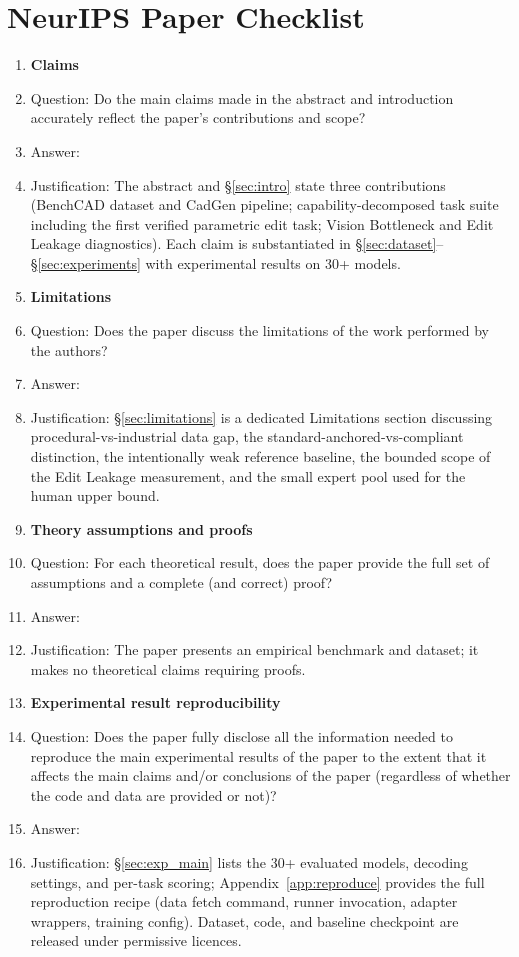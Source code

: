 \documentclass{article}
\begin{document}
\newpage
\section*{NeurIPS Paper Checklist}

\begin{enumerate}

\item {\bf Claims}
    \item[] Question: Do the main claims made in the abstract and introduction accurately reflect the paper's contributions and scope?
    \item[] Answer: \answerYes{}
    \item[] Justification: The abstract and \S\ref{sec:intro} state three contributions (BenchCAD dataset and CadGen pipeline; capability-decomposed task suite including the first verified parametric edit task; Vision Bottleneck and Edit Leakage diagnostics). Each claim is substantiated in \S\ref{sec:dataset}--\S\ref{sec:experiments} with experimental results on 30+ models.

\item {\bf Limitations}
    \item[] Question: Does the paper discuss the limitations of the work performed by the authors?
    \item[] Answer: \answerYes{}
    \item[] Justification: \S\ref{sec:limitations} is a dedicated Limitations section discussing procedural-vs-industrial data gap, the standard-anchored-vs-compliant distinction, the intentionally weak reference baseline, the bounded scope of the Edit Leakage measurement, and the small expert pool used for the human upper bound.

\item {\bf Theory assumptions and proofs}
    \item[] Question: For each theoretical result, does the paper provide the full set of assumptions and a complete (and correct) proof?
    \item[] Answer: \answerNA{}
    \item[] Justification: The paper presents an empirical benchmark and dataset; it makes no theoretical claims requiring proofs.

    \item {\bf Experimental result reproducibility}
    \item[] Question: Does the paper fully disclose all the information needed to reproduce the main experimental results of the paper to the extent that it affects the main claims and/or conclusions of the paper (regardless of whether the code and data are provided or not)?
    \item[] Answer: \answerYes{}
    \item[] Justification: \S\ref{sec:exp_main} lists the 30+ evaluated models, decoding settings, and per-task scoring; Appendix~\ref{app:reproduce} provides the full reproduction recipe (data fetch command, runner invocation, adapter wrappers, training config). Dataset, code, and baseline checkpoint are released under permissive licences.



\end{enumerate}
\end{document}
